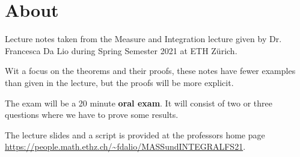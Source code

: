 \section*{About}

Lecture notes taken from the Measure and Integration lecture given by Dr. Francesca Da Lio during Spring Semester 2021 at ETH Zürich.

Wit a focus on the theorems and their proofs,
these notes have fewer examples than given in the lecture, but the proofs will be more explicit.

The exam will be a 20 minute \textbf{oral exam}. It will consist of two or three questions where we have to prove some results.

The lecture slides and a script is provided at the professors home page \url{https://people.math.ethz.ch/~fdalio/MASSundINTEGRALFS21}.


